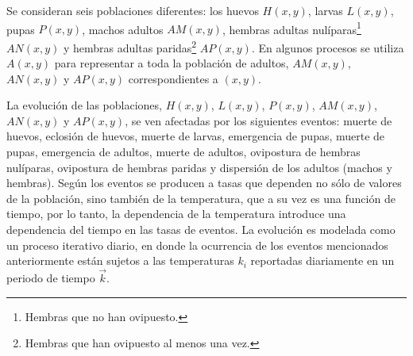 Se consideran seis poblaciones diferentes: los huevos $H(x,y)$, larvas $L(x,y)$, pupas $P(x,y)$,
machos adultos $AM(x,y)$, hembras adultas nulíparas\footnote{Hembras que no han ovipuesto.}
$AN(x,y)$ y hembras adultas paridas\footnote{Hembras que han ovipuesto al menos una vez.} $AP(x,y)$. En algunos procesos se utiliza $A(x, y)$ para representar a toda la población de adultos,
$AM(x,y)$, $AN(x,y)$ y $AP(x,y)$ correspondientes a $(x, y)$.

La evolución de las poblaciones, $H(x,y)$, $L(x,y)$, $P(x,y)$, $AM(x,y)$, $AN(x,y)$ y $AP(x,y)$,
se ven afectadas por los siguientes eventos: muerte de huevos, eclosión de huevos, muerte de
larvas, emergencia de pupas, muerte de pupas, emergencia de adultos, muerte de adultos, ovipostura
de hembras nulíparas, ovipostura de hembras paridas y dispersión de los adultos (machos y hembras).
Según \cite{otero2006stochastic} los eventos se producen a tasas que dependen no sólo de valores
de la población, sino también de la temperatura, que a su vez es una función de tiempo, por lo
tanto, la dependencia de la temperatura introduce una dependencia del tiempo en las tasas de
eventos. La evolución es modelada como un proceso iterativo diario, en donde la ocurrencia de los
eventos mencionados anteriormente están sujetos a las temperaturas $k_{i}$ reportadas diariamente
en un periodo de tiempo $\vec{k}$.








